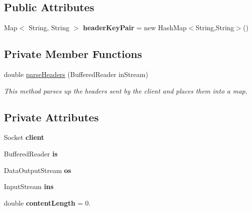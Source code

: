 \subsection*{Public Attributes}
\begin{DoxyCompactItemize}
\item 
\hypertarget{classcom_1_1server_1_1HandleHTTP_a8e81d6717697e6da66f2380a5028d9bf}{Map$<$ String, String $>$ {\bfseries header\-Key\-Pair} = new Hash\-Map$<$String,String$>$()}\label{classcom_1_1server_1_1HandleHTTP_a8e81d6717697e6da66f2380a5028d9bf}

\end{DoxyCompactItemize}
\subsection*{Private Member Functions}
\begin{DoxyCompactItemize}
\item 
double \hyperlink{classcom_1_1server_1_1HandleHTTP_a86cd12e8125ead9a4633ae36c5a9a193}{parse\-Headers} (Buffered\-Reader in\-Stream)
\begin{DoxyCompactList}\small\item\em This method parses up the headers sent by the client and places them into a map. \end{DoxyCompactList}\end{DoxyCompactItemize}
\subsection*{Private Attributes}
\begin{DoxyCompactItemize}
\item 
\hypertarget{classcom_1_1server_1_1HandleHTTP_accb595c4974e3dcf8b16f132f2125720}{Socket {\bfseries client}}\label{classcom_1_1server_1_1HandleHTTP_accb595c4974e3dcf8b16f132f2125720}

\item 
\hypertarget{classcom_1_1server_1_1HandleHTTP_af25c0805b2b95fac99c565f3a757aa3b}{Buffered\-Reader {\bfseries is}}\label{classcom_1_1server_1_1HandleHTTP_af25c0805b2b95fac99c565f3a757aa3b}

\item 
\hypertarget{classcom_1_1server_1_1HandleHTTP_a73bc15187fcb54b20aea1bb79f3f8943}{Data\-Output\-Stream {\bfseries os}}\label{classcom_1_1server_1_1HandleHTTP_a73bc15187fcb54b20aea1bb79f3f8943}

\item 
\hypertarget{classcom_1_1server_1_1HandleHTTP_a348787d7c716d9f4a6e37d7665d5a32a}{Input\-Stream {\bfseries ins}}\label{classcom_1_1server_1_1HandleHTTP_a348787d7c716d9f4a6e37d7665d5a32a}

\item 
\hypertarget{classcom_1_1server_1_1HandleHTTP_ac9235e083433b71b5dbd59e7a13b6043}{double {\bfseries content\-Length} = 0.}\label{classcom_1_1server_1_1HandleHTTP_ac9235e083433b71b5dbd59e7a13b6043}

\end{DoxyCompactItemize}
